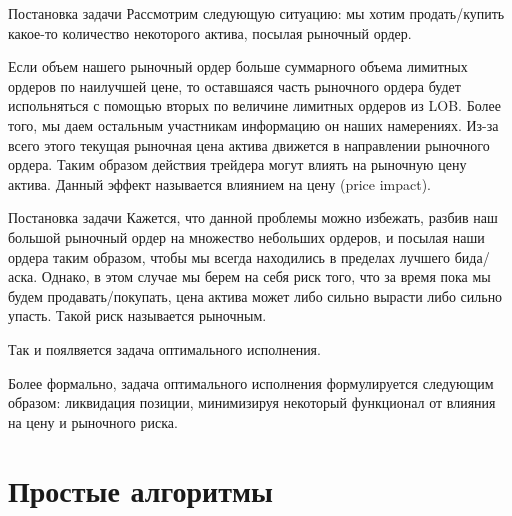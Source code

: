 \documentclass[aspectratio=169]{beamer}
\begin{document}
        
        

    \begin{frame}{Постановка задачи}
        Рассмотрим следующую ситуацию: мы хотим продать/купить какое-то количество некоторого актива, посылая рыночный ордер.
        
        Если объем нашего рыночный ордер больше суммарного объема лимитных ордеров по наилучшей цене, то оставшаяся часть рыночного ордера будет испольняться с помощью вторых по величине лимитных ордеров из LOB. Более того, мы даем остальным участникам информацию он наших намерениях. Из-за всего этого текущая рыночная цена актива движется в направлении рыночного ордера. Таким образом действия трейдера могут влиять на рыночную цену актива.
        Данный эффект называется влиянием на цену (price impact).

    \end{frame}

    \begin{frame}{Постановка задачи}
        Кажется, что данной проблемы можно избежать, разбив наш большой рыночный ордер на множество небольших ордеров, и посылая наши ордера таким образом, чтобы мы всегда находились в пределах лучшего бида/аска. Однако, в этом случае мы берем на себя риск того, что за время пока мы будем продавать/покупать, цена актива может либо сильно вырасти либо сильно упасть. Такой риск называется рыночным. 

        Так и поялвяется задача оптимального исполнения.

        Более формально, задача оптимального исполнения формулируется следующим образом: ликвидация позиции, минимизируя некоторый функционал от влияния на цену и рыночного риска. 
    \end{frame}


    \section{Простые алгоритмы}
\end{document}
